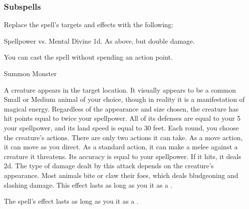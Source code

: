 \subsubsection{Subspells}
Replace the spell's targets and effects with the following:
\begin{spellcontent}
\begin{augmenttargetinginfo}
\end{augmenttargetinginfo}
\begin{augmenteffects}
\begin{spellattack}{Spellpower vs. Mental}
\spellsuccess Divine  \minus1d.
\spellcritical As above, but double damage.
\end{spellattack}
\end{augmenteffects}
\end{spellcontent}
You can cast the spell without spending an action point.
\begin{spellsection}{Summon Monster}
\begin{spellheader}
\end{spellheader}
\begin{spellcontent}
\begin{spelltargetinginfo}
\end{spelltargetinginfo}
\begin{spelleffects}
\spelleffect
A creature appears in the target location.
It visually appears to be a common Small or Medium animal of your choice, though in reality it is a manifestation of magical energy.
Regardless of the appearance and size chosen, the creature has hit points equal to twice your spellpower.
All of its defenses are equal to your 5 \add your spellpower, and its land speed is equal to 30 feet.
Each round, you choose the creature's actions.
There are only two actions it can take.
As a move action, it can move as you direct.
As a standard action, it can make a melee  against a creature it threatens.
Its accuracy is equal to your spellpower.
If it hits, it deals  \minus2d.
The type of damage dealt by this attack depends on the creature's appearance.
Most animals bite or claw their foes, which deals bludgeoning and slashing damage.
This effect lasts as long as you  it as a .
\end{spelleffects}
\end{spellcontent}
\begin{spellfooter}
\end{spellfooter}
\begin{spellsubcontent}
\begin{spellcantrip}
The spell's effect lasts as long as you  it as a .
\end{spellcantrip}
\end{spellsubcontent}
\end{spellsection}
